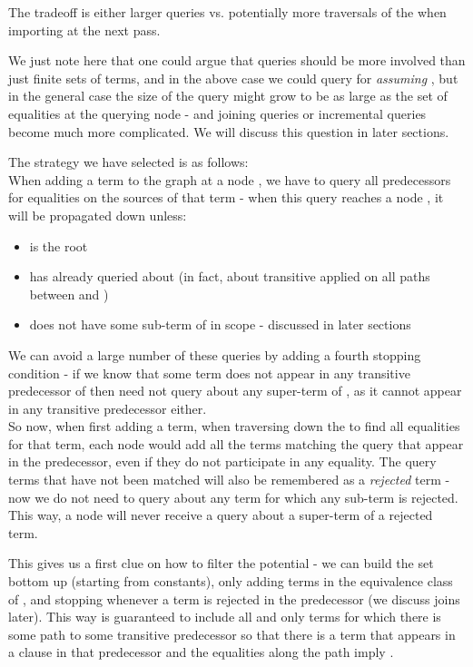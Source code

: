 The tradeoff is either larger queries vs. potentially more traversals of the \cfg when importing at the next pass.

We just note here that one could argue that queries should be more involved than just finite sets of terms, and in the above case we could query for  \emph{assuming} , but in the general case the size of the query might grow to be as large as the set of equalities at the querying node - and joining queries or incremental queries become much more complicated. We will discuss this question in later sections. 

The strategy we have selected is as follows:\\
When adding a term  to the graph at a node , we have to query all predecessors for equalities on the sources  of that term - when this query reaches a node , it will be propagated down unless:
\begin{itemize}
	\item {} is the root
	\item {} has already queried about  (in fact, about transitive  applied on all paths between  and )
	\item {} does not have some sub-term of  in scope - discussed in later sections
\end{itemize}

We can avoid a large number of these queries by adding a fourth stopping condition - if we know that some term  does not appear in any transitive predecessor of  then  need not query about any super-term of , as it cannot appear in any transitive predecessor either.\\
So now, when first adding a term, when traversing down the \cfg to find all equalities for that term, each node would add all the terms matching the query that appear in the predecessor, even if they do not participate in any equality. The query terms that have not been matched will also be remembered as a \emph{rejected} term - 
now we do not need to query about any term for which any sub-term is rejected.
This way, a node will never receive a query about a super-term of a rejected term.

This gives us a first clue on how to filter the potential  - we can build the set bottom up (starting from constants), only adding terms in the equivalence class of , and stopping whenever a term is rejected in the predecessor (we discuss joins later).
This way  is guaranteed to include all and only terms  for which there is some path to some transitive predecessor so that there is a term  that appears in a clause in that predecessor and the equalities along the path imply .

